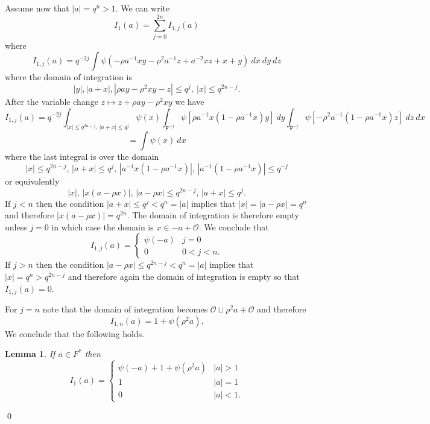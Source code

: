 \documentclass[12pt]{amsart}
\newcommand{\abs}[1]{\left|{#1}\right|}
\newcommand{\p}{\mathfrak{p}}
\renewcommand{\O}{\mathcal{O}}
\newtheorem{lemma}[theorem]{Lemma}
\theoremstyle{remark}
\begin{document}
Assume now that $\abs{a}=q^n>1$.
We can write 
\[
I_1(a)=\sum_{j=0}^{2n} I_{1,j}(a)
\]
where 
\[
I_{1,j}(a)=q^{-2j} \int \psi(-\rho a^{-1}xy-\rho^2a^{-1}z+a^{-2}xz+x+y)\ dx\ dy \ dz
\]
where the domain of integration is 
\[
\abs{y},\abs{a+x},\abs{\rho ay-\rho^2 xy-z}\le q^j,\ \abs{x}\le q^{2n-j}.
\]
After the variable change $z\mapsto z+\rho a y-\rho^2 xy$ we have
\[
I_{1,j}(a)=q^{-2j} \int_{\abs{x}\le q^{2n-j},\,\abs{a+x}\le q^j}\psi(x)\int_{\p^{-j}}\psi[\rho a^{-1}x(1-\rho a^{-1}x)y]\ dy \int_{\p^{-j}}\psi[-\rho^2a^{-1}(1-\rho a^{-1}x)z]\ dz \ dx
\]
\[
=\int\psi(x)\ dx
\]
where the last integral is over the domain
\[
\abs{x}\le q^{2n-j},\,\abs{a+x}\le q^j,\,\abs{a^{-1}x(1-\rho a^{-1}x)},\,\abs{a^{-1}(1-\rho a^{-1}x)}\le q^{-j}
\]
or equivalently
\[
\abs{x},\,\abs{x(a-\rho x)},\,\abs{a-\rho x} \le q^{2n-j},\,\abs{a+x}\le q^j.
\]
If $j<n$ then the condition $\abs{a+x}\le q^j<q^n=\abs{a}$ implies that $\abs{x}=\abs{a-\rho x}=q^n$ and therefore $\abs{x(a-\rho x)}=q^{2n}$. The domain of integration is therefore empty unless $j=0$ in which case the domain is $x\in -a+\O$. We conclude that 
\[
I_{1,j}(a)=\begin{cases} \psi(-a)& j=0 \\  0 & 0<j<n.\end{cases}
\]
If $j>n$ then the condition $\abs{a-\rho x} \le q^{2n-j}<q^n=\abs{a}$ implies that $\abs{x}=q^n>q^{2n-j}$ and therefore again the domain of integration is empty so that $I_{1,j}(a)=0$.

For $j=n$ note that the domain of integration becomes $\O\sqcup \rho^2 a+\O$ and therefore
\[
I_{1,n}(a)=1+\psi(\rho^2a).
\]
We conclude that the following holds.
\begin{lemma} If $a\in F^*$ then
\[
I_1(a)=\begin{cases} \psi(-a)+1+\psi(\rho^2a) & \abs{a}>1 \\ 1 & \abs{a}=1 \\ 0 & \abs{a}<1. \end{cases}
\] 
\end{lemma}
\qed
\end{document}

